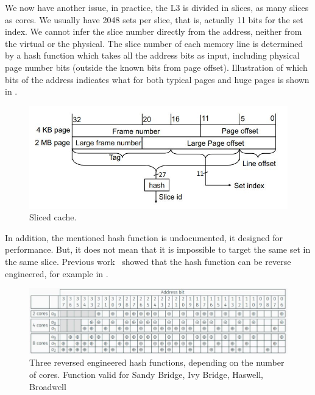 We now have another issue, in practice, the L3 is divided in slices, as many
slices as cores. We usually have 2048 sets per slice, that is, actually 11 bits
for the set index. We cannot infer the slice number directly from the address,
neither from the virtual or the physical. The slice number of each memory line
is determined by a hash function which takes all the address bits as input,
including physical page number bits (outside the known bits from page offset).
Illustration of which bits of the address indicates what for both typical pages
and huge pages is shown in .

\begin{figure}[!ht]
    \centering
    \includegraphics[width=\textwidth]{images/chapter_6/slicedcache.JPG}
    \caption{Sliced cache.}
    \label{fig:slicedcache}
\end{figure}

In addition, the mentioned hash function is undocumented, it designed for
performance. But, it does not mean that it is impossible to target the same set
in the same slice. Previous work~\cite{EURECOM+4671} showed that the hash
function can be reverse engineered, for example in .

\begin{figure}[!ht]
    \centering
    \includegraphics[width=\textwidth]{images/chapter_6/hashfunc.JPG}
    \caption{Three reversed engineered hash functions, depending on the number of cores. Function valid for Sandy Bridge, Ivy Bridge, Haswell, Broadwell}
    \label{fig:hashfunc}
\end{figure}

